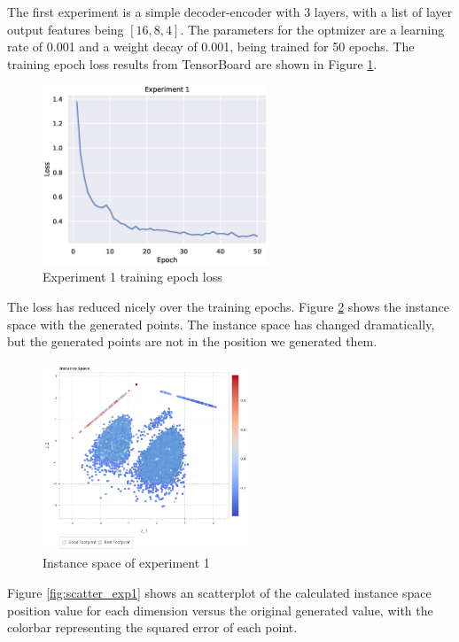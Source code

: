 The first experiment is a simple decoder-encoder with 3 layers, with a list of layer output features being $[16, 8, 4]$. The parameters for the optmizer are a learning rate of 0.001 and a weight decay of 0.001, being trained for 50 epochs. The training epoch loss results from TensorBoard are shown in Figure \ref{fig:exp1}.

\begin{figure}[H]
    \centering
    \includegraphics[width=0.6\textwidth]{Cap5/loss_exp1}
    \caption{Experiment 1 training epoch loss}
    \label{fig:exp1}
\end{figure}

The loss has reduced nicely over the training epochs. Figure \ref{fig:is_exp1} shows the instance space with the generated points. The instance space has changed dramatically, but the generated points are not in the position we generated them. 

\begin{figure}[H]
    \centering
    \includegraphics[width=0.55\textwidth]{Cap5/is_exp1.png}
    \caption{Instance space of experiment 1}
    \label{fig:is_exp1}
\end{figure}

Figure \ref{fig:scatter_exp1} shows an scatterplot of the calculated instance space position value for each dimension versus the original generated value, with the colorbar representing the squared error of each point.

